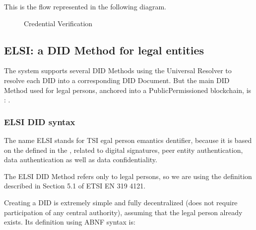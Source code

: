 \documentclass[a4paper,12pt,english]{sphinxhowto}
\begin{document}
\sphinxAtStartPar
This is the flow represented in the following diagram.

\begin{figure}[htbp]
\centering
\capstart

\noindent{}
\caption{Credential Verification}\label{\detokenize{ssi/privacycred:id7}}\end{figure}


\subsection{ELSI: a DID Method for legal entities}
\label{\detokenize{ssi/privacycred:elsi-a-did-method-for-legal-entities}}
\sphinxAtStartPar
The system supports several DID Methods using the Universal Resolver to resolve each DID into a corresponding DID Document.
But the main DID Method used for legal persons, anchored into a Public\sphinxhyphen{}Permissioned blockchain, is : .


\subsubsection{ELSI DID syntax}
\label{\detokenize{ssi/privacycred:elsi-did-syntax}}
\sphinxAtStartPar
The name ELSI stands for TSI egal person emantics dentifier, because it is based on the  defined in the , related to digital signatures, peer entity authentication, data authentication as well as data confidentiality.

\sphinxAtStartPar
The ELSI DID Method refers only to legal persons, so we are using the  definition described in Section 5.1 of ETSI EN 319 412\sphinxhyphen{}1.

\sphinxAtStartPar
Creating a DID is extremely simple and fully decentralized (does not require participation of any central authority), assuming that the legal person already exists. Its definition using ABNF syntax is:

\begin{sphinxVerbatim}[commandchars=\\\{\}]
   
\end{sphinxVerbatim}
\end{document}
